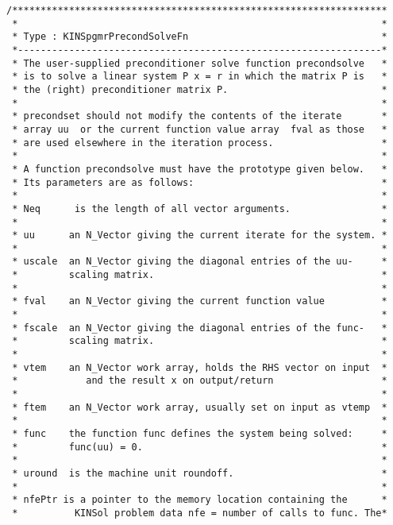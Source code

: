 \begin{verbatim}
/******************************************************************
 *                                                                *           
 * Type : KINSpgmrPrecondSolveFn                                  *
 *----------------------------------------------------------------*
 * The user-supplied preconditioner solve function precondsolve   *
 * is to solve a linear system P x = r in which the matrix P is   *
 * the (right) preconditioner matrix P.                           *
 *                                                                *
 * precondset should not modify the contents of the iterate       *
 * array uu  or the current function value array  fval as those   *
 * are used elsewhere in the iteration process.                   *
 *                                                                *
 * A function precondsolve must have the prototype given below.   *
 * Its parameters are as follows:                                 *
 *                                                                *
 * Neq      is the length of all vector arguments.                *
 *                                                                *
 * uu      an N_Vector giving the current iterate for the system. *
 *                                                                *
 * uscale  an N_Vector giving the diagonal entries of the uu-     *
 *         scaling matrix.                                        *
 *                                                                *
 * fval    an N_Vector giving the current function value          *
 *                                                                *
 * fscale  an N_Vector giving the diagonal entries of the func-   *
 *         scaling matrix.                                        *
 *                                                                *
 * vtem    an N_Vector work array, holds the RHS vector on input  *
 *            and the result x on output/return                   *
 *                                                                *
 * ftem    an N_Vector work array, usually set on input as vtemp  *
 *                                                                *
 * func    the function func defines the system being solved:     *
 *         func(uu) = 0.                                          *
 *                                                                *
 * uround  is the machine unit roundoff.                          *
 *                                                                *
 * nfePtr is a pointer to the memory location containing the      *
 *          KINSol problem data nfe = number of calls to func. The*

\end{verbatim}
